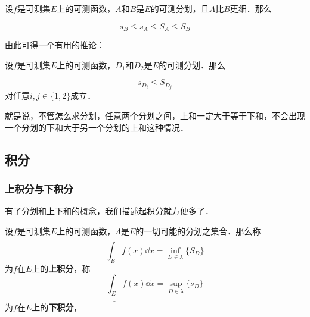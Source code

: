 \begin{lemma}{}\label{Lebes1_lem1}

设$f$是可测集$E$上的可测函数，$A$和$B$是$E$的可测分划，且$A$比$B$更细．那么

\begin{equation}
s_B\leq s_A\leq S_A\leq S_B
\end{equation}


\end{lemma}

由此可得一个有用的推论：

\begin{corollary}{}\label{Lebes1_cor1}
设$f$是可测集$E$上的可测函数，$D_1$和$D_2$是$E$的可测分划．那么

\begin{equation}
s_{D_i}\leq S_{D_j}
\end{equation}
对任意$i, j\in\{1, 2\}$成立．

\end{corollary}

就是说，不管怎么求分划，任意两个分划之间，上和一定大于等于下和，不会出现一个分划的下和大于另一个分划的上和这种情况．






\subsection{积分}

\subsubsection{上积分与下积分}

有了分划和上下和的概念，我们描述起积分就方便多了．

\begin{definition}{}

设$f$是可测集$E$上的可测函数，$\Lambda$是$E$的一切可能的分划之集合．那么称
\begin{equation}
\overline{\int_E} f(x) \dd x=\inf_{D\in \lambda} \{S_D\}
\end{equation}
为$f$在$E$上的\textbf{上积分}，称
\begin{equation}
\underline{\int_E} f(x) \dd x=\sup_{D\in \lambda} \{s_D\}
\end{equation}
为$f$在$E$上的\textbf{下积分}，



\end{definition}

